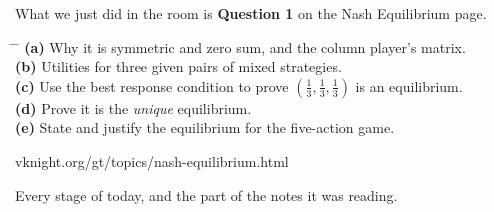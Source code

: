 \newpage
{}

\vspace{0.5cm}

{\large What we just did in the room is \textbf{Question 1} on the Nash
Equilibrium page.}

\vspace{0.9cm}

\hspace{0.6cm}
\begin{minipage}{0.92\linewidth}
{\large
\begin{tabbing}
\hspace{1.2cm} \= \hspace{17cm} \= \kill
\textbf{(a)} \> Why it is symmetric and zero sum, and the column player's
  matrix. \> [3]\\[0.55em]
\textbf{(b)} \> Utilities for three given pairs of mixed strategies. \> [3]\\[0.55em]
\textbf{(c)} \> Use the best response condition to prove
  \((\tfrac13,\tfrac13,\tfrac13)\) is an equilibrium. \> [5]\\[0.55em]
\textbf{(d)} \> Prove it is the \emph{unique} equilibrium. \> [5]\\[0.55em]
\textbf{(e)} \> State and justify the equilibrium for the five-action
  game. \> [3]
\end{tabbing}}
\end{minipage}

\vspace{1.2cm}

\begin{center}
{\large\color{inkgrey} vknight.org/gt/topics/nash-equilibrium.html}
\end{center}

\newpage
\nonotes
{}

\vspace{0.3cm}

{\large Every stage of today, and the part of the notes it was reading.}

\vspace{0.35cm}

